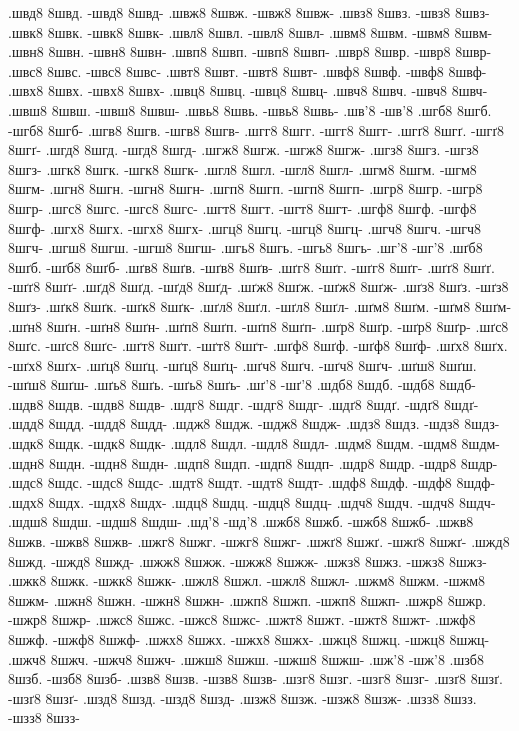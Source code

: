 {.швд8 8швд. -швд8 8швд-
.швж8 8швж. -швж8 8швж-
.швз8 8швз. -швз8 8швз-
.швк8 8швк. -швк8 8швк-
.швл8 8швл. -швл8 8швл-
.швм8 8швм. -швм8 8швм-
.швн8 8швн. -швн8 8швн-
.швп8 8швп. -швп8 8швп-
.швр8 8швр. -швр8 8швр-
.швс8 8швс. -швс8 8швс-
.швт8 8швт. -швт8 8швт-
.швф8 8швф. -швф8 8швф-
.швх8 8швх. -швх8 8швх-
.швц8 8швц. -швц8 8швц-
.швч8 8швч. -швч8 8швч-
.швш8 8швш. -швш8 8швш-
.швь8 8швь. -швь8 8швь-
.шв'8 -шв'8
.шгб8 8шгб. -шгб8 8шгб-
.шгв8 8шгв. -шгв8 8шгв-
.шгг8 8шгг. -шгг8 8шгг-
.шгґ8 8шгґ. -шгґ8 8шгґ-
.шгд8 8шгд. -шгд8 8шгд-
.шгж8 8шгж. -шгж8 8шгж-
.шгз8 8шгз. -шгз8 8шгз-
.шгк8 8шгк. -шгк8 8шгк-
.шгл8 8шгл. -шгл8 8шгл-
.шгм8 8шгм. -шгм8 8шгм-
.шгн8 8шгн. -шгн8 8шгн-
.шгп8 8шгп. -шгп8 8шгп-
.шгр8 8шгр. -шгр8 8шгр-
.шгс8 8шгс. -шгс8 8шгс-
.шгт8 8шгт. -шгт8 8шгт-
.шгф8 8шгф. -шгф8 8шгф-
.шгх8 8шгх. -шгх8 8шгх-
.шгц8 8шгц. -шгц8 8шгц-
.шгч8 8шгч. -шгч8 8шгч-
.шгш8 8шгш. -шгш8 8шгш-
.шгь8 8шгь. -шгь8 8шгь-
.шг'8 -шг'8
.шґб8 8шґб. -шґб8 8шґб-
.шґв8 8шґв. -шґв8 8шґв-
.шґг8 8шґг. -шґг8 8шґг-
.шґґ8 8шґґ. -шґґ8 8шґґ-
.шґд8 8шґд. -шґд8 8шґд-
.шґж8 8шґж. -шґж8 8шґж-
.шґз8 8шґз. -шґз8 8шґз-
.шґк8 8шґк. -шґк8 8шґк-
.шґл8 8шґл. -шґл8 8шґл-
.шґм8 8шґм. -шґм8 8шґм-
.шґн8 8шґн. -шґн8 8шґн-
.шґп8 8шґп. -шґп8 8шґп-
.шґр8 8шґр. -шґр8 8шґр-
.шґс8 8шґс. -шґс8 8шґс-
.шґт8 8шґт. -шґт8 8шґт-
.шґф8 8шґф. -шґф8 8шґф-
.шґх8 8шґх. -шґх8 8шґх-
.шґц8 8шґц. -шґц8 8шґц-
.шґч8 8шґч. -шґч8 8шґч-
.шґш8 8шґш. -шґш8 8шґш-
.шґь8 8шґь. -шґь8 8шґь-
.шґ'8 -шґ'8
.шдб8 8шдб. -шдб8 8шдб-
.шдв8 8шдв. -шдв8 8шдв-
.шдг8 8шдг. -шдг8 8шдг-
.шдґ8 8шдґ. -шдґ8 8шдґ-
.шдд8 8шдд. -шдд8 8шдд-
.шдж8 8шдж. -шдж8 8шдж-
.шдз8 8шдз. -шдз8 8шдз-
.шдк8 8шдк. -шдк8 8шдк-
.шдл8 8шдл. -шдл8 8шдл-
.шдм8 8шдм. -шдм8 8шдм-
.шдн8 8шдн. -шдн8 8шдн-
.шдп8 8шдп. -шдп8 8шдп-
.шдр8 8шдр. -шдр8 8шдр-
.шдс8 8шдс. -шдс8 8шдс-
.шдт8 8шдт. -шдт8 8шдт-
.шдф8 8шдф. -шдф8 8шдф-
.шдх8 8шдх. -шдх8 8шдх-
.шдц8 8шдц. -шдц8 8шдц-
.шдч8 8шдч. -шдч8 8шдч-
.шдш8 8шдш. -шдш8 8шдш-
.шд'8 -шд'8
.шжб8 8шжб. -шжб8 8шжб-
.шжв8 8шжв. -шжв8 8шжв-
.шжг8 8шжг. -шжг8 8шжг-
.шжґ8 8шжґ. -шжґ8 8шжґ-
.шжд8 8шжд. -шжд8 8шжд-
.шжж8 8шжж. -шжж8 8шжж-
.шжз8 8шжз. -шжз8 8шжз-
.шжк8 8шжк. -шжк8 8шжк-
.шжл8 8шжл. -шжл8 8шжл-
.шжм8 8шжм. -шжм8 8шжм-
.шжн8 8шжн. -шжн8 8шжн-
.шжп8 8шжп. -шжп8 8шжп-
.шжр8 8шжр. -шжр8 8шжр-
.шжс8 8шжс. -шжс8 8шжс-
.шжт8 8шжт. -шжт8 8шжт-
.шжф8 8шжф. -шжф8 8шжф-
.шжх8 8шжх. -шжх8 8шжх-
.шжц8 8шжц. -шжц8 8шжц-
.шжч8 8шжч. -шжч8 8шжч-
.шжш8 8шжш. -шжш8 8шжш-
.шж'8 -шж'8
.шзб8 8шзб. -шзб8 8шзб-
.шзв8 8шзв. -шзв8 8шзв-
.шзг8 8шзг. -шзг8 8шзг-
.шзґ8 8шзґ. -шзґ8 8шзґ-
.шзд8 8шзд. -шзд8 8шзд-
.шзж8 8шзж. -шзж8 8шзж-
.шзз8 8шзз. -шзз8 8шзз-
}

